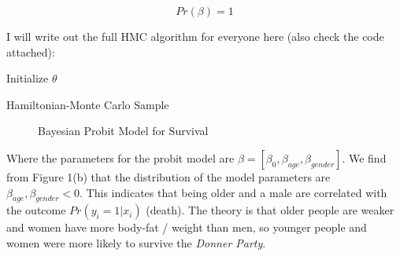 \documentclass[12pt]{article}
\begin{document}
\begin{equation}
Pr(\beta) = 1
\end{equation}

I will write out the full HMC algorithm for everyone here (also check the code attached):

\vspace{5mm}

\begin{algorithm}[H]
Initialize $\theta$\;
 \caption{Hamiltonian-Monte Carlo Sample}
\end{algorithm}

\vspace{5mm}

\begin{figure}[h]
\centering
{}
\caption{Bayesian Probit Model for Survival}
\end{figure}

\vspace{5mm}

Where the parameters for the probit model are $\beta=[\beta_0,\beta_{age},\beta_{gender}]$. We find from Figure 1(b) that the distribution of the model parameters are $\beta_{age},\beta_{gender}<0$. This indicates that being older and a male are correlated with the outcome $Pr(y_i=1|x_i)$ (death). The theory is that older people are weaker and women have more body-fat / weight than men, so younger people and women were more likely to survive the \emph{Donner Party}. 
\end{document}
